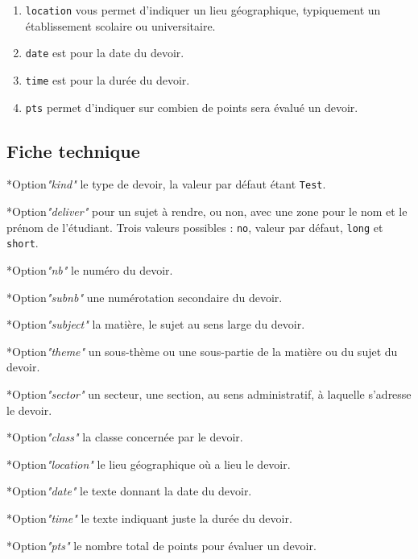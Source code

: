 \documentclass[12pt,a4paper]{scrartcl}
\makeatletter
\theoremstyle{definition}
\newcommand\IDmacro{\@ifstar{\@IDmacroStar}{\@IDmacroNoStar}}
\newcommand\@IDmacroNoStar[3]{%
    \texttt{%
    	\textbackslash#1%
    	\IfStrEq{#2}{0}{}{%
    		\,\,[#2 Option%
			\IfStrEq{#2}{1}{}{s}]%
		}%
	    \IfStrEq{#3}{}{}{%
    		\,\,(#3 Argument%
			\IfStrEq{#3}{1}{}{s})%
		}
   	}
    \immediate\write\tempfile{macro@#1@#2@#3}%
}
\newcommand\@IDmacroStar[2]{%
    \@IDmacroNoStar{#1}{0}{#2}%
}
\newcommand\@IDoptarg{\@ifstar{\@IDoptargStar}{\@IDoptargNoStar}}
\newcommand\@IDoptargStar[2]{%
	\vspace{0.5em}
	--- \texttt{#1%
		\IfStrEq{#2}{}{:}{\,#2:}%
	}%
}
\newcommand\@IDoptargNoStar[2]{%
	\IfStrEq{#2}{}{%
		\@IDoptargStar{#1}{}%
	}{%
		\@IDoptargStar{#1}{\##2}%
	}%
}
\newcommand\IDkey[1]{%
	\@IDoptarg*{Option}{{\itshape "#1"}}%
}
\makeatother
\begin{document}
\begin{enumerate}
    \item \verb+location+ vous permet d'indiquer un lieu géographique, typiquement un établissement scolaire ou universitaire.

    \item \verb+date+ est pour la date du devoir.

    \item \verb+time+ est pour la durée du devoir.

    \item \verb+pts+ permet d'indiquer sur combien de points sera évalué un devoir.
\end{enumerate}


    \subsection{Fiche technique}

\IDmacro{exam}{12}{}

\IDkey{kind} le type de devoir, la valeur par défaut étant \verb+Test+.

\IDkey{deliver} pour un sujet à rendre, ou non, avec une zone pour le nom et le prénom de l'étudiant. Trois valeurs possibles : \verb+no+, valeur par défaut, \verb+long+ et \verb+short+.

\IDkey{nb} le numéro du devoir.

\IDkey{subnb} une numérotation secondaire du devoir.

\IDkey{subject} la matière, le sujet au sens large du devoir.

\IDkey{theme} un sous-thème ou une sous-partie de la matière ou du sujet du devoir.

\IDkey{sector} un secteur, une section, au sens administratif, à laquelle s'adresse le devoir.

\IDkey{class} la classe concernée par le devoir.

\IDkey{location} le lieu géographique où a lieu le devoir.

\IDkey{date} le texte donnant la date du devoir.

\IDkey{time} le texte indiquant juste la durée du devoir.

\IDkey{pts} le nombre total de points pour évaluer un devoir.




\newcommand\exosoptionsdescription{
Toutes les options données ci-dessous sont facultatives. Attention car avec les versions simplement étoilées il faut utiliser \texttt{id},
tandis qu'avec les versions doublement étoilées on doit se servir de l'option \texttt{title}.
}
\end{document}

